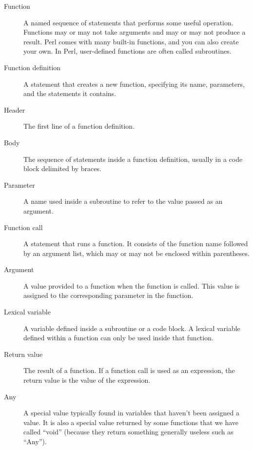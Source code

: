 \begin{description}

\item[Function] A named sequence of statements that performs 
some useful operation. Functions may or may not take arguments 
and may or may not produce a result. Perl comes with many 
built-in functions, and you can also create your own. In Perl, 
user-defined functions are often called subroutines.

\item[Function definition]  A statement that creates a new function,
specifying its name, parameters, and the statements it contains.

\item[Header] The first line of a function definition.

\item[Body] The sequence of statements inside a function 
definition, usually in a code block delimited by braces.

\item[Parameter] A name used inside a subroutine to refer to 
the value passed as an argument.

\item[Function call] A statement that runs a function. It
consists of the function name followed by an argument list, 
which may or may not be enclosed within parentheses.

\item[Argument]  A value provided to a function when the function is called.
This value is assigned to the corresponding parameter in the function.

\item[Lexical variable]  A variable defined inside a subroutine 
or a code block.  A lexical variable defined within a function can 
only be used inside that function.

\item[Return value]  The result of a function.  If a function call
is used as an expression, the return value is the value of
the expression.

\item[Any]  A special value typically found in variables that 
haven't been assigned a value. It is also a special value 
returned by some functions that we have called ``void'' (because 
they return something generally useless such as ``Any'').


\end{description}
